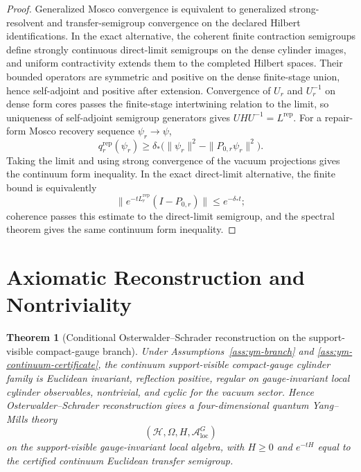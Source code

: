 \documentclass[11pt]{article}
\numberwithin{equation}{section}
\newtheorem{theorem}{Theorem}[section]
\theoremstyle{remark}
\newcommand{\Rep}{\mathrm{rep}}
\newcommand{\A}{\mathcal A}
\newcommand{\Hcal}{\mathcal H}
\begin{document}
\begin{proof}
Generalized Mosco convergence is equivalent to generalized strong-resolvent and
transfer-semigroup convergence on the declared Hilbert identifications. In the exact alternative,
the coherent finite contraction semigroups define strongly continuous direct-limit semigroups on
the dense cylinder images, and uniform contractivity extends them to the completed Hilbert
spaces. Their bounded operators are symmetric and positive on the dense finite-stage union, hence
self-adjoint and positive after extension. Convergence of \(U_r\)
and \(U_r^{-1}\) on dense form cores passes the finite-stage intertwining relation to the limit,
so uniqueness of self-adjoint semigroup generators gives \(UHU^{-1}=L^{\mathrm{rep}}\). For a
repair-form Mosco recovery sequence \(\psi_r\to\psi\),
\[
q_r^{\mathrm{rep}}(\psi_r)
\ge \delta_*\bigl(\|\psi_r\|^2-\|P_{0,r}\psi_r\|^2\bigr).
\]
Taking the limit and using strong convergence of the vacuum projections gives the continuum form
inequality. In the exact direct-limit alternative, the finite bound is equivalently
\[
\|e^{-tL_r^{\Rep}}(I-P_{0,r})\|\le e^{-\delta_*t};
\]
coherence passes this estimate to the direct-limit semigroup, and the spectral theorem gives the
same continuum form inequality.
\end{proof}

\section{Axiomatic Reconstruction and Nontriviality}

\begin{theorem}[Conditional Osterwalder--Schrader reconstruction on the support-visible compact-gauge branch]
\label{thm:os}
Under Assumptions~\ref{ass:ym-branch} and \ref{ass:ym-continuum-certificate}, the continuum
support-visible compact-gauge cylinder family is Euclidean invariant, reflection positive,
regular on gauge-invariant local cylinder observables, nontrivial, and cyclic for the vacuum
sector. Hence Osterwalder--Schrader reconstruction gives a four-dimensional quantum Yang--Mills
theory
\[
(\Hcal,\Omega,H,\A_{\mathrm{loc}}^{G})
\]
on the support-visible gauge-invariant local algebra, with \(H\ge0\) and
\(e^{-tH}\) equal to the certified continuum Euclidean transfer semigroup.
\end{theorem}
\end{document}
